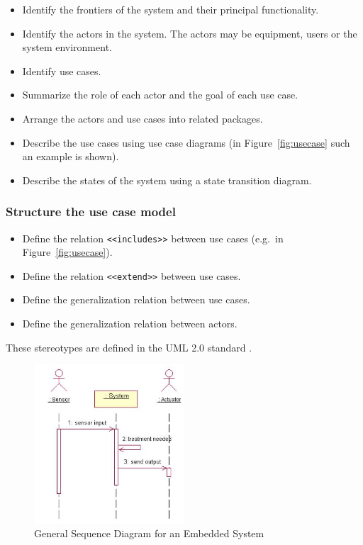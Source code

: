 \documentclass{overturerepchap}
\begin{document}
\begin{itemize}
\item Identify the frontiers of the system and their principal functionality.
\item Identify the actors in the system. The actors may be equipment,
users or the system environment.
\item Identify use cases.
\item Summarize the role of each actor and the goal of each use case.
\item Arrange the actors and use cases into related packages.
\item Describe the use cases using use case diagrams (in
Figure~\ref{fig:usecase} such an example is shown).
\item Describe the states of the system using a state transition diagram.
\end{itemize}

\subsubsection{Structure the use case model}

\begin{itemize}
\item Define the relation {\tt <<includes>>} between use cases
(e.g.\ in Figure~\ref{fig:usecase}).
\item Define the relation {\tt <<extend>>} between use cases.
\item Define the generalization relation between use cases.
\item Define the generalization relation between actors.
\end{itemize}

These stereotypes are defined in the UML 2.0 standard \cite{UML20}.

\begin{figure}
\begin{center}
\includegraphics[width=0.5\textwidth]{figures/generalseqdia2.jpg}
\end{center}
\caption{General Sequence Diagram for an Embedded System}\label{fig:seqdiag}
\end{figure}
\end{document}
